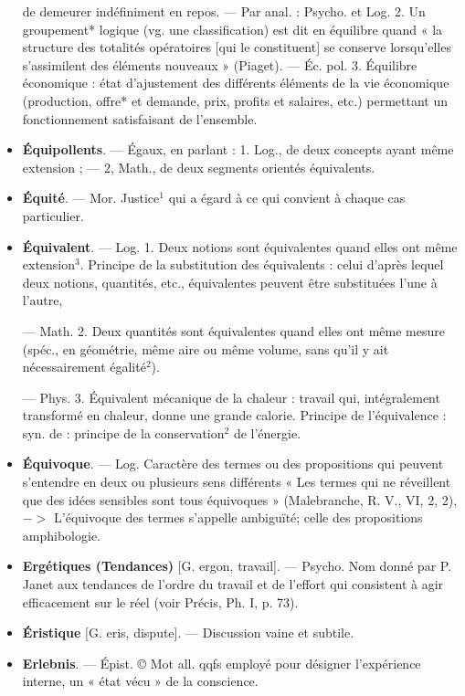 \begin{itemize}[leftmargin=1cm, label=, itemsep=1pt]
de demeurer indéfiniment en repos.
— Par anal. : Psycho. et Log. 2. Un
groupement* logique (vg. une classification) est dit en équilibre quand
« la structure des totalités opératoires [qui le constituent] se conserve lorsqu'elles s’assimilent des
éléments nouveaux » (Piaget). —
Éc. pol. 3. Équilibre économique :
état d'ajustement des différents éléments de la vie économique (production, offre* et demande, prix,
profits et salaires, etc.) permettant
un fonctionnement satisfaisant de
l’ensemble.

\item {\bf Équipollents}. — Égaux, en parlant :
1. Log., de deux concepts ayant
même extension ; — 2, Math., de
deux segments orientés équivalents.

\item {\bf Équité}. — Mor. Justice$^1$ qui a égard
à ce qui convient à chaque cas particulier.

\item {\bf Équivalent}. — Log. 1. Deux notions
sont équivalentes quand elles ont
même extension$^3$. Principe de la
substitution des équivalents : celui
d’après lequel deux notions, quantités, etc., équivalentes peuvent être
substituées l’une à l’autre,

— Math. 2. Deux quantités sont
équivalentes quand elles ont même
mesure (spéc., en géométrie, même
aire ou même volume, sans qu'il y
ait nécessairement égalité$^2$).

— Phys. 3. Équivalent mécanique
de la chaleur : travail qui, intégralement transformé en chaleur, donne
une grande calorie. Principe de
l’équivalence : syn. de : principe de
la conservation$^2$ de l’énergie.

\item {\bf Équivoque}. — Log. Caractère des
termes ou des propositions qui peuvent s'entendre en deux ou plusieurs
sens différents « Les termes qui ne
réveillent que des idées sensibles
sont tous équivoques » (Malebranche, R. V., VI, 2, 2), $->$
L'équivoque des termes s'appelle
ambiguïté; celle des propositions
amphibologie.

\item {\bf Ergétiques (Tendances)} [G. ergon,
travail]. — Psycho. Nom donné par
P. Janet aux tendances de l’ordre
du travail et de l’effort qui consistent à agir efficacement sur le réel
(voir Précis, Ph. I, p. 73).

\item {\bf Éristique} [G. eris, dispute]. — Discussion vaine et subtile.

\item {\bf Erlebnis}. — Épist. © Mot all. qqfs
employé pour désigner l’expérience
interne, un « état vécu » de la conscience.


\end{itemize}
